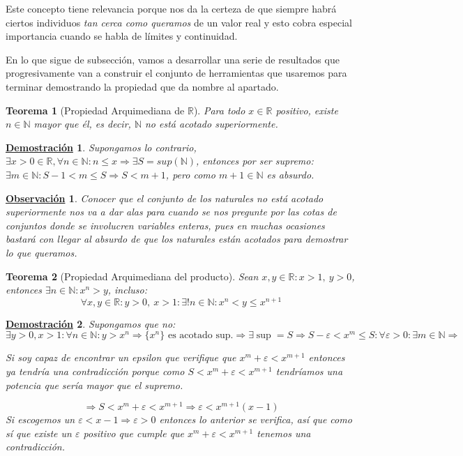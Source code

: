 \documentclass[10pt,a4paper,openright]{book}
\theoremstyle{break}
\newtheorem{theo}{Teorema}[chapter]
\newtheorem*{demo}{\underline{Demostración}}
\newtheorem{obs}{\underline{Observación}}[chapter]
\begin{document}
Este concepto tiene relevancia porque nos da la certeza de que siempre habrá ciertos individuos \textit{tan cerca como queramos} de un valor real y esto cobra especial importancia cuando se habla de límites y continuidad.

En lo que sigue de subsección, vamos a desarrollar una serie de resultados que progresivamente van a construir el conjunto de herramientas que usaremos para terminar demostrando la propiedad que da nombre al apartado.

\begin{theo}[Propiedad Arquimediana de $\mathbb R$]
\label{theo:arquimediana}
Para todo $x\in \mathbb R$ positivo, existe $n\in \mathbb N$ mayor que él, es decir, $\mathbb N$ no está acotado superiormente.
\end{theo}
\begin{demo}
Supongamos lo contrario, $\exists x>0\in \mathbb R, \forall n \in \mathbb{N} : n\leq x \Rightarrow \exists S=sup(\mathbb N)$, entonces por ser supremo: $\exists m \in \mathbb N : S-1<m\leq S\Rightarrow S<m+1$, pero como $m+1\in \mathbb N$ es absurdo.
\end{demo}

\begin{obs}
Conocer que el conjunto de los naturales no está acotado superiormente nos va a dar alas para cuando se nos pregunte por las cotas de conjuntos donde se involucren variables enteras, pues en muchas ocasiones bastará con llegar al absurdo de que los naturales están acotados para demostrar lo que queramos.
\end{obs}

\begin{theo}[Propiedad Arquimediana del producto]
\label{theo:arquimediana_prod}
Sean $x,y\in \mathbb{R} : x>1, \ y>0$, entonces $\exists n\in \mathbb N: x^n > y$, incluso:
$$\forall x,y \in \mathbb{R} : y>0, \ x>1: \exists! n\in\mathbb N: x^n<y\leq x^{n+1}$$
\end{theo}
\begin{demo}
Supongamos que no:
$$\exists y>0, x>1: \forall n\in \mathbb N: y>x^n\Rightarrow\{x^n\}\mbox{ es acotado sup.}\Rightarrow \exists \sup=S\Rightarrow S-\varepsilon< x^m\leq S: \forall \varepsilon>0:\exists m\in \mathbb N\Rightarrow$$

Si soy capaz de encontrar un epsilon que verifique que $x^m+\varepsilon<x^{m+1}$ entonces ya tendría una contradicción porque como $S<x^m+\varepsilon< x^{m+1}$ tendríamos una potencia que sería mayor que el supremo.

$$\Rightarrow S< x^m +\varepsilon <x^{m+1}\Rightarrow \varepsilon<x^{m+1}(x-1)$$
Si escogemos un $\varepsilon< x-1\Rightarrow \varepsilon>0$ entonces lo anterior se verifica, así que como sí que existe un $\varepsilon$ positivo que cumple que $x^m+\varepsilon< x^{m+1}$ tenemos una contradicción.
\end{demo}
\end{document}
